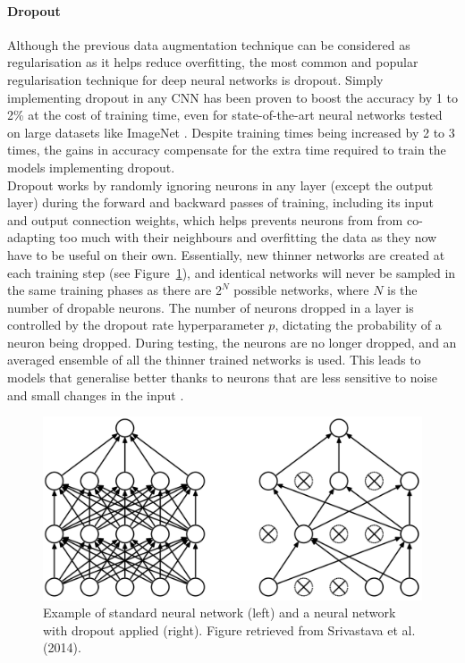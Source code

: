 \paragraph{Dropout}

Although the previous data augmentation technique can be considered as regularisation as it  helps reduce overfitting, the most common and popular regularisation technique for deep neural networks is dropout. Simply implementing dropout in any CNN has been proven to boost the accuracy by 1 to 2\% \citep{Geron2019} at the cost of training time, even for state-of-the-art neural networks tested on large datasets like ImageNet \citep{Srivastava2014}. Despite training times being increased by 2 to 3 times, the gains in accuracy compensate for the extra time required to train the models implementing dropout.\\

Dropout works by randomly ignoring neurons in any layer (except the output layer) during the forward and backward passes of training, including its input and output connection weights, which helps prevents neurons from from co-adapting too much with their neighbours and overfitting the data as they now have to be useful on their own. Essentially, new thinner networks are created at each training step (see Figure~\ref{fig:litsurvey-dropout}), and identical networks will never be sampled in the same training phases as there are $2^N$ possible networks, where $N$ is the number of dropable neurons. The number of neurons dropped in a layer is controlled by the dropout rate hyperparameter $p$, dictating the probability of a neuron being dropped. During testing, the neurons are no longer dropped, and an averaged ensemble of all the thinner trained networks is used. This leads to models that generalise better thanks to neurons that are less sensitive to noise and small changes in the input \citep{Srivastava2014}.

\begin{figure}[ht]
\centerline{\includegraphics[width=\textwidth]{figures/litsurvey/dropout.png}}
\caption{\label{fig:litsurvey-dropout}Example of standard neural network (left) and a neural network with dropout applied (right). Figure retrieved from Srivastava et al. (2014).}
\end{figure}

